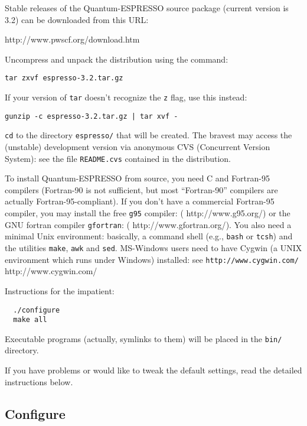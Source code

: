 \documentclass[12pt,a4paper]{article}
\def\stableversion{3.2} %
\begin{document}
Stable releases of the Quantum-ESPRESSO source package (current version
is \stableversion) can be downloaded from this URL:
\medskip

%
                  {http://www.pwscf.org/download.htm}
\medskip

\noindent
Uncompress and unpack the distribution using the command:
\medskip

\texttt{tar zxvf espresso-\stableversion.tar.gz}
\medskip

\noindent
If your version of \texttt{tar} doesn't recognize the \texttt{z} flag,
use this instead:
\medskip

\texttt{gunzip -c espresso-\stableversion.tar.gz | tar xvf -}
\medskip

\noindent
\texttt{cd} to the directory \texttt{espresso/} that will be created.
The bravest may access the (unstable) development version via anonymous 
CVS (Concurrent Version System): see the file \texttt{README.cvs}
contained in the distribution.

To install Quantum-ESPRESSO from source, you need C and Fortran-95
compilers (Fortran-90 is not sufficient, but most ``Fortran-90''
compilers are actually Fortran-95-compliant).
If you don't have a commercial Fortran-95 compiler, you may install
the free \texttt{g95} compiler:
(%
                   {http://www.g95.org/})
or the GNU fortran compiler \texttt{gfortran}:
(%
                   {http://www.gfortran.org/}).
You also need a minimal Unix environment: basically, a command shell
(e.g., \texttt{bash} or \texttt{tcsh}) and the utilities
\texttt{make}, \texttt{awk} and \texttt{sed}.
MS-Windows users need to have Cygwin (a UNIX environment which runs
under Windows) installed: see
\htmladdnormallink%
{\texttt{http://www.cygwin.com/}}%
        {http://www.cygwin.com/}

Instructions for the impatient:
\begin{verbatim}
  ./configure
  make all
\end{verbatim}
Executable programs (actually, symlinks to them) will be placed in the
\texttt{bin/} directory.

If you have problems or would like to tweak the default settings, read
the detailed instructions below.

\subsection{Configure}
\end{document}
